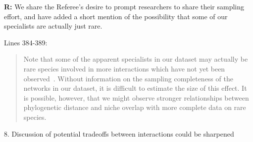 \documentclass[12pt]{letter}
\begin{document}
		\textbf{R:} We share the Referee's desire to prompt researchers to share their sampling effort, and have added a short mention of the possibility  that some of our specialists are actually just rare.


		Lines 384-389:


		\begin{quotation}

			Note that some of the apparent specialists in our dataset may actually be rare species involved in more interactions which have not yet been observed~\citep{Bluthgen2006,Poisot2015}. Without information on the sampling completeness of the networks in our dataset, it is difficult to estimate the size of this effect. 
			It is possible, however, that we might observe stronger relationships between phylogenetic
			distance and niche overlap with more complete data on rare species.


		\end{quotation}


	8. Discussion of potential tradeoffs between interactions could be sharpened
\end{document}

